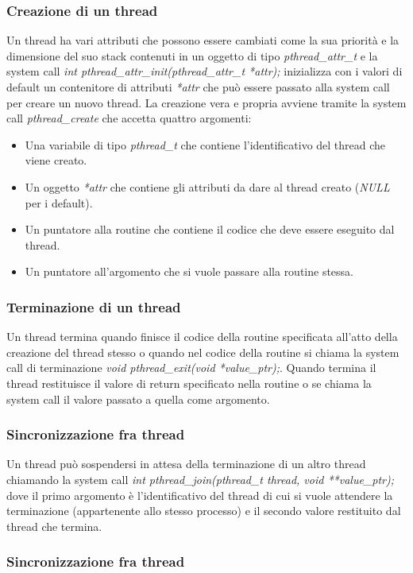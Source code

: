 \subsubsection{Creazione di un thread}
Un thread ha vari attributi che possono essere cambiati come la sua priorit\`a e la dimensione del suo stack contenuti in un oggetto di tipo \emph{pthread\_attr\_t} e la system call
\emph{int pthread\_attr\_init(pthread\_attr\_t *attr);} inizializza con i valori di default un contenitore di attributi \emph{*attr} che pu\`o essere passato alla system call per creare
un nuovo thread. La creazione vera e propria avviene tramite la system call \emph{pthread\_create} che accetta quattro argomenti:
\begin{itemize}
	\item Una variabile di tipo \emph{pthread\_t} che contiene l'identificativo del thread che viene creato.
	\item Un oggetto \emph{*attr} che contiene gli attributi da dare al thread creato (\emph{NULL} per i default).
	\item Un puntatore alla routine che contiene il codice che deve essere eseguito dal thread.
	\item Un puntatore all'argomento che si vuole passare alla routine stessa.
\end{itemize}
\subsubsection{Terminazione di un thread}
Un thread termina quando finisce il codice della routine specificata all'atto della creazione del thread stesso o quando nel codice della routine si chiama la system call di terminazione
\emph{void pthread\_exit(void *value\_ptr);}. Quando termina il thread restituisce il valore di return specificato nella routine o se chiama la system call il valore passato a quella
come argomento. 
\subsubsection{Sincronizzazione fra thread}
Un thread pu\`o sospendersi in attesa della terminazione di un altro thread chiamando la system call \emph{int pthread\_join(pthread\_t thread, void **value\_ptr);} dove il primo 
argomento \`e l'identificativo del thread di cui si vuole attendere la terminazione (appartenente allo stesso processo) e il secondo valore restituito dal thread che termina. 
\subsubsection{Sincronizzazione fra thread}
